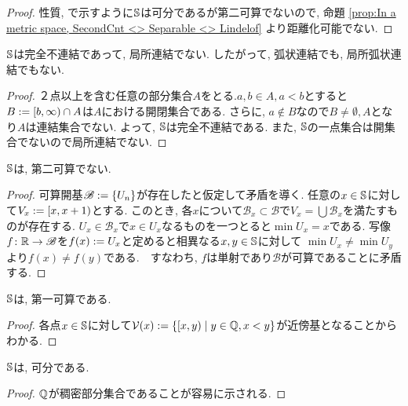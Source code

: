 \documentclass[uplatex, dvipdfmx, a4paper, 12pt, class=jsbook, crop=false]{standalone}
\begin{document}
\begin{proof}
	性質,  で示すように$ \mathbb{S} $は可分であるが第二可算でないので, 命題 \ref{prop:In a metric space, SecondCnt <> Separable <> Lindelof} より距離化可能でない.
\end{proof}

\begin{property}
	$ \mathbb{S} $は完全不連結であって, 局所連結でない.	したがって, 弧状連結でも, 局所弧状連結でもない.
\end{property}

\begin{proof}
	２点以上を含む任意の部分集合$ A $をとる.$ a, b \in A, a < b $とすると$ B \mathrel{:=} \left[ b , \infty \right) \cap A $は$ A $における開閉集合である. さらに, $ a \notin B $なので$ B \neq \emptyset, A $となり$ A $は連結集合でない. よって, $ \mathbb{S} $は完全不連結である. また, $ \mathbb{S} $の一点集合は開集合でないので局所連結でない.
\end{proof}

\begin{property}
	$ \mathbb{S} $は, 第二可算でない.
\end{property}

\begin{proof}
	可算開基$ \mathscr{B} \mathrel{:=} \{U_n\} $が存在したと仮定して矛盾を導く. 任意の$ x \in \mathbb{S} $に対して$ V_x \mathrel{:=} \left[ x , x+1 \right) $とする. このとき, 各$ x $について$ \mathscr{B}_x \subset \mathscr{B} $で$ V_x = \bigcup \mathscr{B}_x $を満たすものが存在する. $ U_x \in \mathscr{B}_x $で$ x \in U_x $なるものを一つとると$ \min{U_x} = x $である. 写像$ f \colon \mathbb{R} \to \mathscr{B} $を$ f(x) \mathrel{:=} U_x $と定めると相異なる$ x, y \in \mathbb{S} $に対して
	$ \min{U_x} \neq \min{U_y} $より$ f(x) \neq f(y) $である.　すなわち, $f$は単射であり$ \mathscr{B} $が可算であることに矛盾する.
\end{proof}

\begin{property}
	$ \mathbb{S} $は, 第一可算である.
\end{property}

\begin{proof}
	各点$ x \in \mathbb{S} $に対して$ \mathcal{V}(x) \defeq \setcomp{\intco{x}{y}}{y \in \Q, x < y} $が近傍基となることからわかる.
\end{proof}

\begin{property}
	$ \mathbb{S} $は, 可分である.
\end{property}

\begin{proof}
	$ \mathbb{Q} $が稠密部分集合であることが容易に示される.
\end{proof}
\end{document}
